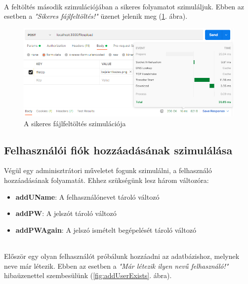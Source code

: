 \newpage

\\

A feltöltés második szimulációjában a sikeres folyamatot szimuláljuk. Ebben az esetben a \textit{"Sikeres fájlfeltöltés!"} üzenet jelenik meg (\ref{fig:uploadSuccess}. ábra).

\begin{figure}[h]
	\centering
		\includegraphics[width=15truecm, height=7truecm]{images/uploadSuccess.png}
	\caption{A sikeres fájlfeltöltés szimulációja}
	\label{fig:uploadSuccess}
\end{figure}


\subsection{Felhasználói fiók hozzáadásának szimulálása}

Végül egy adminisztrátori műveletet fogunk szimulálni, a felhasználó hozzáadásának folyamatát. Ehhez szükségünk lesz három változóra:

\begin{itemize}
\item{\textbf{addUName}: A felhasználónevet tároló változó}
\item{\textbf{addPW}: A jelszót tároló változó}
\item{\textbf{addPWAgain}: A jelszó ismételt begépelését tároló változó}
\end{itemize}

\\

Először egy olyan felhasználót próbálunk hozzáadni az adatbázishoz, melynek neve már létezik. Ebben az esetben a \textit{"Már létezik ilyen nevű felhasználó!"} hibaüzenettel szembesülünk (\ref{fig:addUserExists}. ábra).

